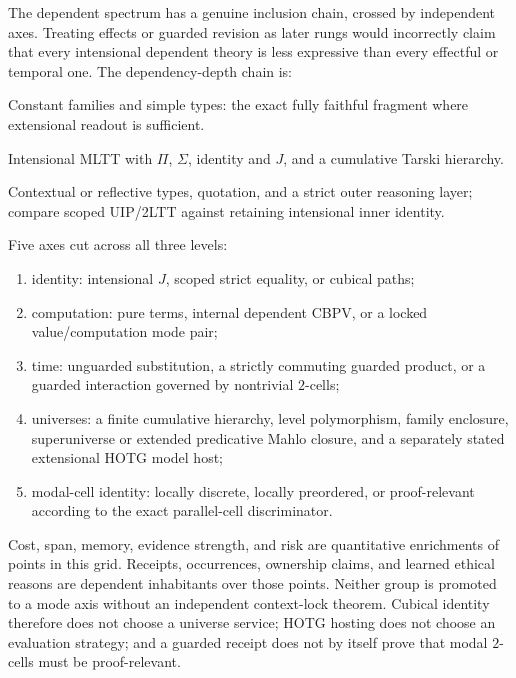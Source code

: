 \documentclass[11pt]{article}
\theoremstyle{definition}
\theoremstyle{remark}
\begin{document}
The dependent spectrum has a genuine inclusion chain, crossed by independent
axes.  Treating effects or guarded revision as later rungs would incorrectly
claim that every intensional dependent theory is less expressive than every
effectful or temporal one.  The dependency-depth chain is:

\begin{description}[leftmargin=1.5cm,style=nextline]
\item[$D_0$] Constant families and simple types: the exact fully faithful
  fragment where extensional readout is sufficient.
\item[$D_1$] Intensional MLTT with $\Pi$, $\Sigma$, identity and $J$, and a
  cumulative Tarski hierarchy.
\item[$D_2$] Contextual or reflective types, quotation, and a strict outer
  reasoning layer; compare scoped UIP/2LTT against retaining intensional inner
  identity.
\end{description}

Five axes cut across all three levels:

\begin{enumerate}
\item identity: intensional $J$, scoped strict equality, or cubical paths;
\item computation: pure terms, internal dependent CBPV, or a locked
  value/computation mode pair;
\item time: unguarded substitution, a strictly commuting guarded product, or a
  guarded interaction governed by nontrivial $2$-cells;
\item universes: a finite cumulative hierarchy, level polymorphism, family
  enclosure, superuniverse or extended predicative Mahlo closure, and a
  separately stated extensional HOTG model host;
\item modal-cell identity: locally discrete, locally preordered, or
  proof-relevant according to the exact parallel-cell discriminator.
\end{enumerate}

Cost, span, memory, evidence strength, and risk are quantitative enrichments of
points in this grid.  Receipts, occurrences, ownership claims, and learned
ethical reasons are dependent inhabitants over those points.  Neither group is
promoted to a mode axis without an independent context-lock theorem.  Cubical
identity therefore does not choose a universe service; HOTG hosting does not
choose an evaluation strategy; and a guarded receipt does not by itself prove
that modal $2$-cells must be proof-relevant.
\end{document}

